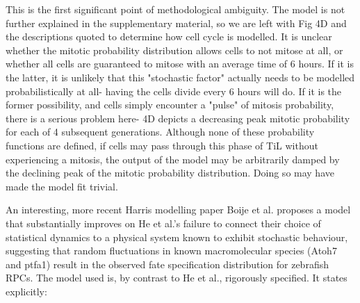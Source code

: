 \documentclass{ut-thesis}
\begin{document}
This is the first significant point of methodological ambiguity. The model is not further explained in the supplementary material, so we are left with Fig 4D and the descriptions quoted to determine how cell cycle is modelled. It is unclear whether the mitotic probability distribution allows cells to not mitose at all, or whether all cells are guaranteed to mitose with an average time of 6 hours. If it is the latter, it is unlikely that this "stochastic factor" actually needs to be modelled probabilistically at all- having the cells divide every 6 hours will do. If it is the former possibility, and cells simply encounter a "pulse" of mitosis probability, there is a serious problem here- 4D depicts a decreasing peak mitotic probability for each of 4 subsequent generations. Although none of these probability functions are defined, if cells may pass through this phase of TiL without experiencing a mitosis, the output of the model may be arbitrarily damped by the declining peak of the mitotic probability distribution. Doing so may have made the model fit trivial.

An interesting, more recent Harris modelling paper Boije et al. \cite{Boije2015} proposes a model that substantially improves on He et al.'s failure to connect their choice of statistical dynamics to a physical system known to exhibit stochastic behaviour, suggesting that random fluctuations in known macromolecular species (Atoh7 and ptfa1) result in the observed fate specification distribution for zebrafish RPCs. The model used is, by contrast to He et al., rigorously specified. It states explicitly:

\bigskip
\end{document}
